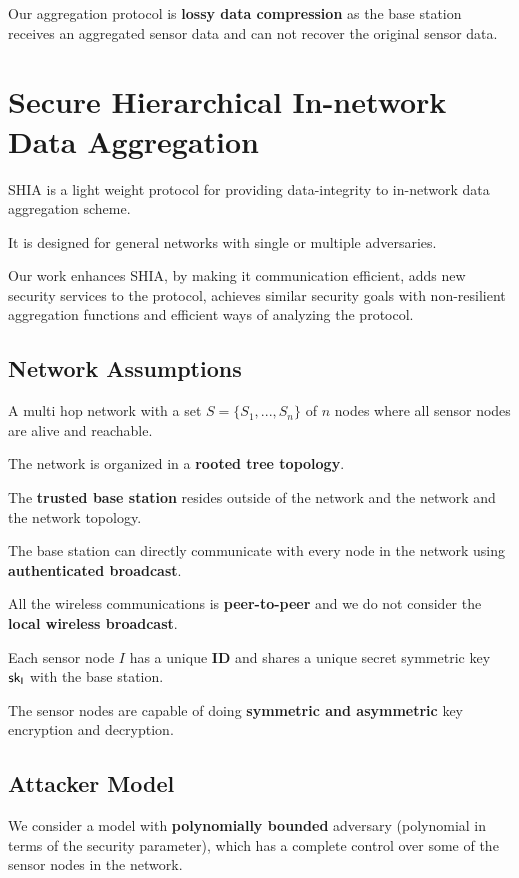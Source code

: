 \documentclass[%
  slidesonly,%
  semlayer%
  ]{seminar}                                  %
\begin{document}
\begin{slide}
    Our aggregation protocol is \textbf{lossy data compression} as the base station receives an aggregated sensor data and can not recover the original sensor data.
    \vfill
    \clearpage

\section*{Secure Hierarchical In-network Data Aggregation}
    \vfill
    SHIA is a light weight protocol for providing data-integrity to in-network data aggregation scheme.
    
    It is designed for general networks with single or multiple adversaries.
    
    Our work enhances SHIA, by making it communication efficient, adds new security services to the protocol, achieves similar security goals with non-resilient aggregation functions and efficient ways of analyzing the protocol.
    \vfill
    \clearpage

    \subsection*{Network Assumptions}
      \vfill
      A multi hop network with a set $ S = \{S_{1},...,S_{n}\} $ of $n$ nodes where all sensor nodes are alive and reachable. 

      The network is organized in a \textbf{rooted tree topology}.

      The \textbf{trusted base station} resides outside of the network and the network and the network topology. 

      The base station can directly communicate with every node in the network using \textbf{authenticated broadcast}.

      All the wireless communications is \textbf{peer-to-peer} and we do not consider the \textbf{local wireless broadcast}.

      Each sensor node $I$ has a unique \textbf{ID} and shares a unique secret symmetric key $\sf{sk}_{I}$ with the base station.

      The sensor nodes are capable of doing \textbf{symmetric and asymmetric} key encryption and decryption.
      \vfill
      \clearpage

    \subsection*{Attacker Model}
      \vfill
      We consider a model with \textbf{polynomially bounded} adversary (polynomial in terms of the security parameter), which has a complete control over some of the sensor nodes in the network.
   

\end{slide}
\end{document}
